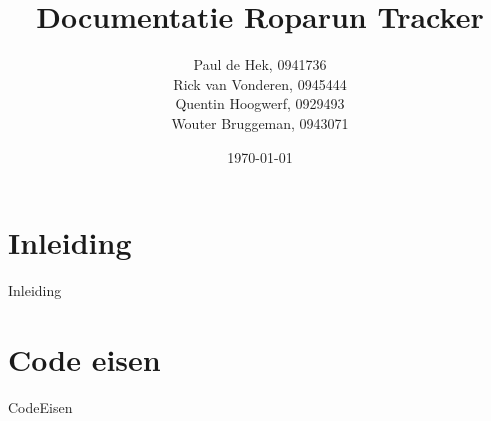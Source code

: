 \documentclass[12pt, a4paper]{article}
\date{\today}
\title{\textbf{Documentatie Roparun Tracker}}
\author{
	Paul de Hek, 0941736 \\
	Rick van Vonderen, 0945444 \\
	Quentin Hoogwerf, 0929493 \\
	Wouter Bruggeman, 0943071 \\
}
\begin{document}
	\maketitle
	\thispagestyle{empty}
	\newpage

	\tableofcontents
	\setcounter{page}{1}
	\newpage

	\section{Inleiding}
	{Inleiding}
	\newpage

	\section{Code eisen}
	{CodeEisen}
	\newpage
\end{document}
